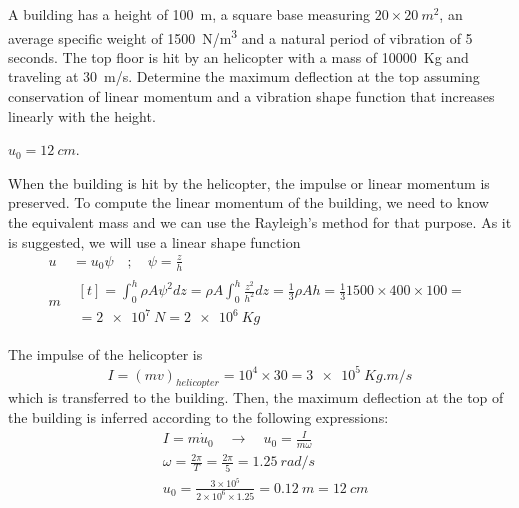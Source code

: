 
\begin{Exercise}[label={helicopter_impulse}]
A building has a height of \qty{100}{m}, a square base measuring $20\times\SI{20}{m^2}$, an average specific weight of \qty{1500}{N/m^3} and a natural period of vibration of 5 seconds. The top floor is hit by an helicopter with a mass of \qty{10000}{Kg} and traveling at \qty{30}{m/s}. Determine the maximum deflection at the top assuming conservation of linear momentum and a vibration shape function that increases linearly with the height.

\begin{center}
\end{center}

\shortAnswer $u_0 = \SI{12}{cm}$.
\end{Exercise}



\begin{Answer}[ref={helicopter_impulse}]
When the building is hit by the helicopter, the impulse or linear momentum is preserved. To compute the linear momentum of the building, we need to know the equivalent mass and we can use the Rayleigh's method for that purpose. As it is suggested, we will use a linear shape function
\begin{align*}
u& = u_0\psi \quad ; \quad \psi = \frac{z}{h} \\
m& \begin{multlined}[t]= \int_0^h \rho A\psi^2dz = \rho A\int_0^h\frac{z^2}{h^2}dz = \frac{1}{3}\rho Ah = \frac{1}{3} 1500 \times 400 \times 100 = \\
    = \SI{2e7}{N} = \SI{2e6}{Kg} \end{multlined}
\end{align*}

The impulse of the helicopter is
$$
I = (mv)_{helicopter} = 10^4 \times 30 = \SI{3e5}{Kg.m/s}
$$
which is transferred to the building. Then, the maximum deflection at the top of the building is inferred according to the following expressions:
\begin{align*}
&I = m\dot{u}_0 \quad \rightarrow \quad u_0 = \frac{I}{m\omega} \\
&\omega = \frac{2\pi}{T} = \frac{2\pi}{5} = \SI{1.25}{rad/s} \\
&u_0 = \frac{3\times 10^5}{2\times 10^6\times 1.25} = \SI{0.12}{m} = \SI{12}{cm}
\end{align*}
\end{Answer}
